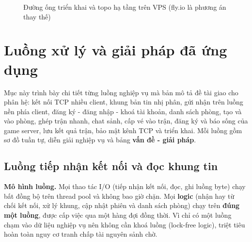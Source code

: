 \begin{figure}[H]
\caption{Đường ống triển khai và topo hạ tầng trên VPS (fly.io là phương án thay thế)}
\label{fig:D-hatang}
\end{figure}

\section{Luồng xử lý và giải pháp đã ứng dụng}
Mục này trình bày chi tiết từng luồng nghiệp vụ mà bản mô tả đề tài giao cho phân hệ: kết nối TCP nhiều client,
khung bản tin nhị phân, gửi nhận trên luồng nền phía client, đăng ký - đăng nhập - khoá tài khoản, danh sách phòng,
tạo và vào phòng, ghép trận nhanh, chat sảnh, cấp vé vào trận, đăng ký và báo sống của game server, lưu kết quả trận,
bảo mật kênh TCP và triển khai. Mỗi luồng gồm sơ đồ tuần tự, diễn giải nghiệp vụ và bảng
\textbf{vấn đề - giải pháp}.

\subsection{Luồng tiếp nhận kết nối và đọc khung tin}
\textbf{Mô hình luồng.} Mọi thao tác I/O (tiếp nhận kết nối, đọc, ghi luồng byte) chạy bất đồng bộ
trên thread pool và không bao giờ chặn. Mọi \textbf{logic} (nhận hay từ chối kết nối, xử lý khung, cập nhật phiên
và danh sách phòng) chạy trên \textbf{đúng một luồng}, được cấp việc qua một hàng đợi đồng thời. Vì chỉ có một luồng
chạm vào dữ liệu nghiệp vụ nên không cần khoá luồng (lock-free logic), triệt tiêu hoàn toàn nguy cơ tranh chấp tài nguyên sảnh chờ.

